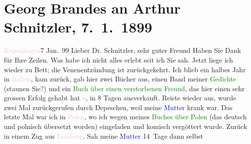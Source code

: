 

               \section[Georg Brandes an Arthur Schnitzler, 7. 1. 1899]{ Georg Brandes an Arthur Schnitzler, 7. 1. 1899}\nopagebreak{}\rehead{ }\normalsize\beginnumbering{} \toendnotes[C]{\smallbreak\pagebreak[2]} 
\toendnotes[C]{\smallbreak}\pstart
           \raggedleft{}{\pb}\textcolor{pink}{Kopenhagen}{}\ledrightnote{\textcolor{pink}{Kopenhagen}}{ }7 Jan. 99\pend
           \pstart{}Lieber Dr. Schnitzler, sehr guter Freund\pend\pstart
           Haben Sie Dank für Ihre Zeilen. Was habe ich nicht alles erlebt seit ich Sie sah.
                    Jetzt liege ich wieder zu Bett; die Venenentzündung ist zurückgekehrt.\pend
           \pstart
           Ich blieb ein halbes Jahr in \textcolor{pink}{Italien}{}\ledrightnote{\textcolor{pink}{Italien}}, kam
                    zurück, gab hier zwei Bücher aus, einen Band meiner \textcolor{green}{Gedichte}{} (staunen Sie?) und ein \textcolor{green}{Buch über einen verstorbenen Freund}{}, das
                    hier einen sehr grossen Erfolg gehabt hat –, in 8 Tagen ausverkauft. Reiste
                    wieder aus, wurde zwei Mal zurückgerufen durch Depeschen, {\pb}weil meine \textcolor{blue}{Mutter}{} krank war. Das letzte Mal war ich
                    in \textcolor{pink}{Polen}{}\ledrightnote{\textcolor{pink}{Polen}}, wo ich wegen meines \textcolor{green}{Buches über Polen}{} (das deutsch und
                    polnisch übersetzt worden) eingeladen und komisch vergöttert wurde.\pend
           \pstart
           Zurück in einem Zug aus \textcolor{pink}{Lemberg}{}\ledrightnote{\textcolor{pink}{Lviv}}. Sah meine \textcolor{blue}{Mutter}{} 14 Tage dann selbst
